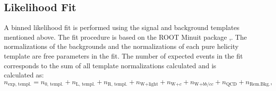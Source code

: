  
\subsection{Likelihood Fit} 

A binned likelihood fit is performed using the signal and background templates mentioned above. The fit procedure is based on the ROOT {\sc Minuit} package \cite{James:310399},\cite{Brun:1997pa}. The normalizations of the backgrounds and the normalizations of each pure \ttbar helicity template are free parameters in the fit. The number of expected events in the fit corresponds to the sum of all template normalizations calculated and is calculated as:
\begin{equation}
n_{\textrm{exp, templ.}}= n_{\textrm{0, templ.}} + n_{\textrm{L, templ.}} +n_{\textrm{R, templ.}}+n_{\textrm{W+light}}+n_{\textrm{W+$c$}}+n_{\textrm{W+$bb/cc$}}+n_{\textrm{QCD}}+n_{\textrm{Rem.Bkg.}},   
\label{eq:nParams}
\end{equation}

